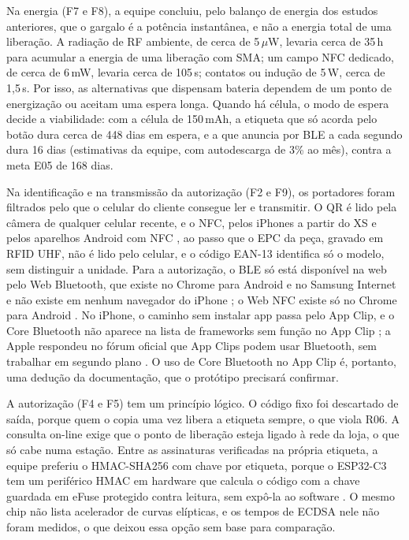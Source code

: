 Na energia (F7 e F8), a equipe concluiu, pelo balanço de energia dos estudos anteriores, que o gargalo é a potência instantânea, e não a energia total de uma liberação. A radiação de RF ambiente, de cerca de 5\,$\mu$W, levaria cerca de 35\,h para acumular a energia de uma liberação com SMA; um campo NFC dedicado, de cerca de 6\,mW, levaria cerca de 105\,s; contatos ou indução de 5\,W, cerca de 1,5\,s. Por isso, as alternativas que dispensam bateria dependem de um ponto de energização ou aceitam uma espera longa. Quando há célula, o modo de espera decide a viabilidade: com a célula de 150\,mAh, a etiqueta que só acorda pelo botão dura cerca de 448 dias em espera, e a que anuncia por BLE a cada segundo dura 16 dias (estimativas da equipe, com autodescarga de 3\% ao mês), contra a meta E05 de 168 dias.

Na identificação e na transmissão da autorização (F2 e F9), os portadores foram filtrados pelo que o celular do cliente consegue ler e transmitir. O QR é lido pela câmera de qualquer celular recente, e o NFC, pelos iPhones a partir do XS e pelos aparelhos Android com NFC \cite{apple2026corenfc}, ao passo que o EPC da peça, gravado em RFID UHF, não é lido pelo celular, e o código EAN-13 identifica só o modelo, sem distinguir a unidade. Para a autorização, o BLE só está disponível na web pelo Web Bluetooth, que existe no Chrome para Android e no Samsung Internet e não existe em nenhum navegador do iPhone \cite{chrome2026webbluetooth,caniuse2026webbluetooth}; o Web NFC existe só no Chrome para Android \cite{chrome2026webnfc}. No iPhone, o caminho sem instalar app passa pelo App Clip, e o Core Bluetooth não aparece na lista de frameworks sem função no App Clip \cite{apple2026appclipfuncoes}; a Apple respondeu no fórum oficial que App Clips podem usar Bluetooth, sem trabalhar em segundo plano \cite{apple2020forumble}. O uso de Core Bluetooth no App Clip é, portanto, uma dedução da documentação, que o protótipo precisará confirmar.

A autorização (F4 e F5) tem um princípio lógico. O código fixo foi descartado de saída, porque quem o copia uma vez libera a etiqueta sempre, o que viola R06. A consulta on-line exige que o ponto de liberação esteja ligado à rede da loja, o que só cabe numa estação. Entre as assinaturas verificadas na própria etiqueta, a equipe preferiu o HMAC-SHA256 com chave por etiqueta, porque o ESP32-C3 tem um periférico HMAC em hardware que calcula o código com a chave guardada em eFuse protegido contra leitura, sem expô-la ao software \cite{espressif2026esp32c3,espressif2026hmac}. O mesmo chip não lista acelerador de curvas elípticas, e os tempos de ECDSA nele não foram medidos, o que deixou essa opção sem base para comparação.

